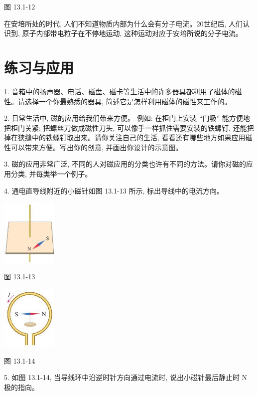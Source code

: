 \documentclass[10pt]{article}
\begin{document}
图 13.1-12

在安培所处的时代, 人们不知道物质内部为什么会有分子电流。20世纪后, 人们认识到, 原子内部带电粒子在不停地运动, 这种运动对应于安培所说的分子电流。

\section*{练习与应用}

1. 音箱中的扬声器、电话、磁盘、磁卡等生活中的许多器具都利用了磁体的磁性。请选择一个你最熟悉的器具, 简述它是怎样利用磁体的磁性来工作的。

2. 日常生活中, 磁的应用给我们带来方便。 例如: 在柜门上安装 “门吸” 能方便地把柜门关紧; 把螺丝刀做成磁性刀头, 可以像手一样抓住需要安装的铁螺钉, 还能把掉在狭缝中的铁螺钉取出来。请你关注自己的生活, 看看还有哪些地方如果应用磁性可以带来方便。写出你的创意, 并画出你设计的示意图。

3. 磁的应用非常广泛, 不同的人对磁应用的分类也许有不同的方法。请你对磁的应用分类, 并每类举一个例子。

4. 通电直导线附近的小磁针如图 13.1-13 所示, 标出导线中的电流方向。

\begin{center}
\includegraphics[max width=0.2\textwidth]{images/01911d5f-8e38-70c0-b5b8-2b399bd115b6_113_835197.jpg}
\end{center}

图 13.1-13

\begin{center}
\includegraphics[max width=0.2\textwidth]{images/01911d5f-8e38-70c0-b5b8-2b399bd115b6_113_739556.jpg}
\end{center}

图 13.1-14

5. 如图 13.1-14, 当导线环中沿逆时针方向通过电流时, 说出小磁针最后静止时 \(\mathrm{N}\) 极的指向。
\end{document}
